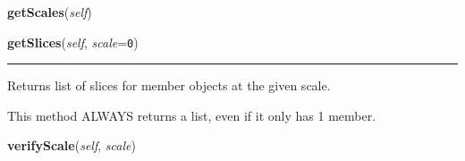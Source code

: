     \label{multireg:objectlist:ObjectList:getScales}
    \vspace{0.5ex}

    \begin{boxedminipage}{\textwidth}

    \raggedright \textbf{getScales}(\textit{self})

    \end{boxedminipage}

    \label{multireg:objectlist:ObjectList:getSlices}
    \vspace{0.5ex}

    \begin{boxedminipage}{\textwidth}

    \raggedright \textbf{getSlices}(\textit{self}, \textit{scale}=\texttt{0\-})

    \vspace{-1.5ex}

    \rule{\textwidth}{0.5\fboxrule}
    Returns list of slices for member objects at the given scale.

    This method ALWAYS returns a list, even if it only has 1 member.

    \vspace{1ex}

    \end{boxedminipage}

    \label{multireg:objectlist:ObjectList:verifyScale}
    \vspace{0.5ex}

    \begin{boxedminipage}{\textwidth}

    \raggedright \textbf{verifyScale}(\textit{self}, \textit{scale})

    \end{boxedminipage}

